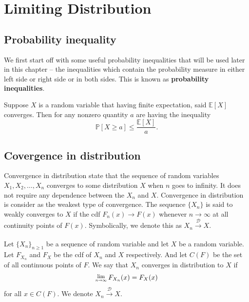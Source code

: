 \chapter{Limiting Distribution}

\section{Probability inequality}
We first start off with some useful probability inequalities that will be used later in this chapter -- the inequalities 
which contain the probability measure in either left side or right side or in both sides. This is known as
\textbf{probability inequalities}.

\begin{theorem}
    Suppose $X$ is a random variable that having finite expectation, said $\mathbb{E}[X]$ converges. Then 
    for any nonzero quantity $a$ are having the inequality
    \begin{equation}
        \mathbb{P}[X \geq a] \leq \frac{\mathbb{E}[X]}{a}.
    \end{equation}
\end{theorem}

\section{Covergence in distribution}

Convergence in distribution state that 
the sequence of random variables $X_1, X_2, \ldots, X_n$ 
converges to some distribution $X$ when $n$ goes to infinity.
It does not require any dependence between the $X_n$ and $X$. Convergence in distribution is 
consider as the weakest type of convergence. The sequence $\{X_n\}$ is 
said to weakly converges to $X$ if the cdf $F_n(x) \to F(x)$ whenever $n \to \infty$ at all 
continuity points of $F(x)$. Symbolically, we denote this as $X_n \xrightarrow[]{\mathcal{D}} X$.

\begin{definition}
    Let $\{X_n\}_{n \geq 1}$ be a sequence of random variable and let $X$ be a random variable. Let $F_{X_n}$ and 
    $F_X$ be the cdf of $X_n$ and $X$ respectively. And let $C(F)$ be the set of all continuous points of
    $F$. We say that $X_n$ converges in distribution to $X$ if 
    \begin{equation}
        \Lim{n \to \infty} F_{X_n}(x) = F_X(x)
    \end{equation}
    for all $x \in C(F)$. We denote $X_n \xrightarrow[]{\mathcal{D}} X$. 
\end{definition}

